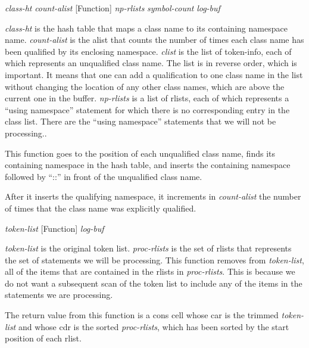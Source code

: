\vspace{1em}
\noindent
{}
\usebox{\funcname}\emph{class-ht} \emph{count-alist}
 \hfill [Function]
\hspace*{\wd\funcname}\emph{np-rlists}
\hspace*{\wd\funcname}\emph{symbol-count} \emph{log-buf}

\begin{doc-string}
\emph{class-ht} is the hash table that maps a class name to its containing namespace
name.  \emph{count-alist} is the alist that counts the number of times each class
name has been qualified by its enclosing namespace.  \emph{clist} is the list of
token-info, each of which represents an unqualified class name.  The list is in
reverse order, which is important.  It means that one can add a qualification to
one class name in the list without changing the location of any other class
names, which are above the current one in the buffer.  \emph{np-rlists} is a list of
rlists, each of which represents a ``using namespace'' statement for which
there is no corresponding entry in the class list.  There are the ``using
namespace'' statements that we will not be processing..

This function goes to the position of each unqualified class name, finds its
containing namespace in the hash table, and inserts the containing namespace
followed by ``::'' in front of the unqualified class name.

After it inserts the qualifying namespace, it increments in \emph{count-alist} the number
of times that the class name was explicitly qualified.
\end{doc-string}

\vspace{1em}
\noindent
{}
\usebox{\funcname}\emph{token-list}
 \hfill [Function]
\hspace*{\wd\funcname}\emph{log-buf}

\begin{doc-string}
\emph{token-list} is the original token list.  \emph{proc-rlists} is the set of rlists that
represents the set of statements we will be processing.  This function removes
from \emph{token-list}, all of the items that are contained in the rlists in
\emph{proc-rlists}.  This is because we do not want a subsequent scan of the token list
to include any of the items in the statements we are processing.

The return value from this function is a cons cell whose car is the trimmed
\emph{token-list} and whose cdr is the sorted \emph{proc-rlists}, which has been sorted by the
start position of each rlist.
\end{doc-string}

